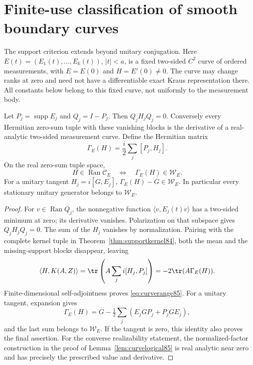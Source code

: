 \section{Finite-use classification of smooth boundary curves}
\label{sec:curves85}
The support criterion extends beyond unitary conjugation.  Here
$E(t)=(E_1(t),\ldots,E_k(t))$, $|t|<a$, is a fixed two-sided
$C^2$ curve of ordered measurements, with $E=E(0)$ and
$H=E'(0)\ne0$.  The curve may change ranks at zero and need not
have a differentiable exact Kraus representation there.  All constants
below belong to this fixed curve, not uniformly to the measurement body.

\begin{lemma}
\label{lem:curvegenerator85}
Let $P_j=\operatorname{supp}E_j$ and $Q_j=I-P_j$.  Then
$Q_jH_jQ_j=0$.  Conversely every Hermitian zero-sum tuple with these
vanishing blocks is the derivative of a real-analytic two-sided
measurement curve.  Define the Hermitian matrix
\begin{equation}\label{eq:curvegenerator85}
 \Gamma_E(H)=\frac i2\sum_j[P_j,H_j].
\end{equation}
On the real zero-sum tuple space,
\begin{equation}\label{eq:curverange85}
 H\in\operatorname{Ran}\mathcal C_E
 \quad\Longleftrightarrow\quad \Gamma_E(H)\in\mathcal W_E.
\end{equation}
For a unitary tangent $H_j=i[G,E_j]$,
$\Gamma_E(H)-G\in\mathcal W_E$.  In particular every stationary
unitary generator belongs to $\mathcal W_E$.
\end{lemma}
\begin{proof}
For $v\in\operatorname{Ran}Q_j$, the nonnegative function
$\langle v,E_j(t)v\rangle$ has a two-sided minimum at zero;
its derivative vanishes.  Polarization on that subspace gives
$Q_jH_jQ_j=0$.  The sum of the $H_j$ vanishes by normalization.
Pairing with the complete kernel tuple in
Theorem~\ref{thm:supportkernel84}, both the mean and the
missing-support blocks disappear, leaving
\[
 \langle H,K(A,Z)\rangle
 =\tr\left(A\sum_ji[H_j,P_j]\right)
 =-2\tr(A\Gamma_E(H)).
\]
Finite-dimensional self-adjointness proves \eqref{eq:curverange85}.
For a unitary tangent, expansion gives
\[
 \Gamma_E(H)=G-\tfrac12\sum_j(E_jGP_j+P_jGE_j),
\]
and the last sum belongs to $\mathcal W_E$.  If the tangent is zero,
this identity also proves the final assertion.  For the converse
realizability statement, the normalized-factor construction in the
proof of Lemma~\ref{lem:curvelogical85} is real analytic near zero
and has precisely the prescribed value and derivative.
\end{proof}

